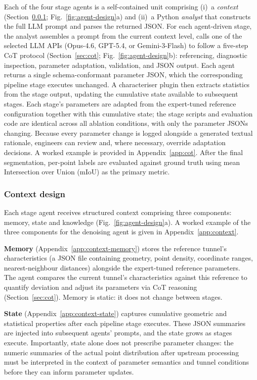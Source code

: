 \documentclass[a4paper,fleqn]{cas-dc}
\begin{document}
{Each of the four stage agents is a self-contained unit comprising (i)~a \emph{context} (Section~\ref{sec:context-comp}; Fig.~\ref{fig:agent-design}a) and (ii)~a Python \textit{analyst} that constructs the full LLM prompt and parses the returned JSON. For each agent-driven stage, the analyst assembles a prompt from the current context level, calls one of the selected LLM APIs (Opus-4.6, GPT-5.4, or Gemini-3-Flash) to follow a five-step CoT protocol (Section~\ref{sec:cot}; Fig.~\ref{fig:agent-design}b): referencing, diagnostic inspection, parameter adaptation, validation, and JSON output. Each agent returns a single schema-conformant parameter JSON, which the corresponding pipeline stage executes unchanged. A characteriser plugin then extracts statistics from the stage output, updating the cumulative state available to subsequent stages. Each stage's parameters are adapted from the expert-tuned reference configuration together with this cumulative state; the stage scripts and evaluation code are identical across all ablation conditions, with only the parameter JSONs changing. Because every parameter change is logged alongside a generated textual rationale, engineers can review and, where necessary, override adaptation decisions. A worked example is provided in Appendix~\ref{app:cot}. After the final segmentation, per-point labels are evaluated against ground truth using mean Intersection over Union (mIoU) as the primary metric.




\subsubsection{Context design}\label{sec:context-comp}

Each stage agent receives structured context comprising three components: memory, state and knowledge (Fig.~\ref{fig:agent-design}a). A worked example of the three components for the denoising agent is given in Appendix~\ref{app:context}.

\textbf{Memory} (Appendix~\ref{app:context-memory}) stores the reference tunnel's characteristics (a JSON file containing geometry, point density, coordinate ranges, nearest-neighbour distances) alongside the expert-tuned reference parameters. The agent compares the current tunnel's characteristics against this reference to quantify deviation and adjust its parameters via CoT reasoning (Section~\ref{sec:cot}). Memory is static: it does not change between stages.


\textbf{State} (Appendix~\ref{app:context-state}) captures cumulative geometric and statistical properties after each pipeline stage executes. These JSON summaries are injected into subsequent agents' prompts, and the state grows as stages execute. Importantly, state alone does not prescribe parameter changes: the numeric summaries of the actual point distribution after upstream processing must be interpreted in the context of parameter semantics and tunnel conditions before they can inform parameter updates.


}
\end{document}
